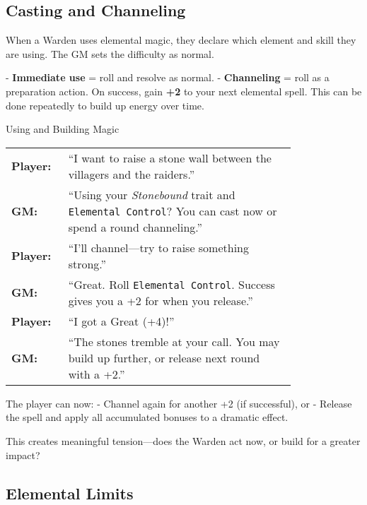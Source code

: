 \subsection{Casting and Channeling}


When a Warden uses elemental magic, they declare which element and skill they are using. The GM sets the difficulty as normal.

- \textbf{Immediate use} = roll and resolve as normal.
- \textbf{Channeling} = roll as a preparation action. On success, gain \textbf{+2} to your next elemental spell. This can be done repeatedly to build up energy over time.

\begin{Example}{Using and Building Magic}
    \begin{tabular}{@{}l p{0.8\linewidth}@{}}
        \textbf{Player:} & “I want to raise a stone wall between the villagers and the raiders.” \\
        \textbf{GM:} & “Using your \textit{Stonebound} trait and \texttt{Elemental Control}? You can cast now or spend a round channeling.” \\
        \textbf{Player:} & “I’ll channel—try to raise something strong.” \\
        \textbf{GM:} & “Great. Roll \texttt{Elemental Control}. Success gives you a +2 for when you release.” \\
        \textbf{Player:} & “I got a Great (+4)!” \\
        \textbf{GM:} & “The stones tremble at your call. You may build up further, or release next round with a +2.”
    \end{tabular}
\end{Example}

The player can now:
- Channel again for another +2 (if successful), or  
- Release the spell and apply all accumulated bonuses to a dramatic effect.

This creates meaningful tension—does the Warden act now, or build for a greater impact?

\subsection{Elemental Limits}

